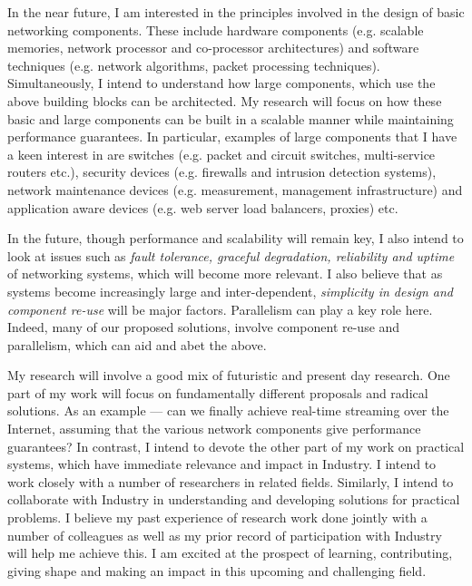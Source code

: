 \documentclass[a4paper, 10pt]{article}
\begin{document}
In the near future, I am interested in the 
principles involved in the design of basic networking 
components. These include
hardware components (e.g. scalable memories, 
network processor and co-processor architectures) and 
software techniques (e.g. network algorithms, packet processing 
techniques). 
  Simultaneously, I intend to understand how large components, which use
the above building blocks can be architected.
My research will focus on how these basic and large
components can be built in a scalable manner while maintaining 
performance guarantees. 
In particular, examples of large components that I have a keen
interest in are switches 
(e.g. packet and circuit switches, multi-service routers etc.), 
security devices (e.g. firewalls and intrusion detection 
systems), network maintenance devices (e.g. measurement,
management infrastructure) and application aware devices
(e.g. web server load balancers, proxies) etc. 


 In the future, though performance and scalability will remain key,
I also intend to look at issues such as {\it fault tolerance, graceful degradation,
reliability and uptime} of networking systems, which will become more relevant. 
I also believe that as systems become increasingly large and 
inter-dependent, {\it simplicity in design and component 
re-use} will be major factors.
Parallelism can play a key role here.
Indeed, many of our proposed solutions, involve component re-use and 
parallelism, which can aid and abet the above.


 My research will involve a good mix of futuristic and present 
day research. 
One part of my work will focus on fundamentally different proposals and
radical solutions. As an example
--- can we finally achieve real-time streaming over the Internet,
assuming that the various network components give performance guarantees?
In contrast, I intend to devote the other part of my work 
on practical systems, which have immediate relevance and impact in Industry.
I intend to work closely with a number of
researchers in related fields. Similarly, I intend to
collaborate with Industry in understanding and developing solutions
for practical problems. I believe my past experience of research
work done jointly with a number of colleagues as well as my prior record
of participation with Industry will help me achieve this. 
I am excited at the
prospect of learning, contributing, giving shape and making an
impact in this upcoming and challenging field.  
\end{document}
